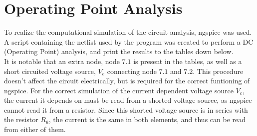 \section{Operating Point Analysis}
\label{sec:simulation}

To realize the computational simulation of the circuit analysis, ngspice was used. A script containing the netlist used by the program was created to perform a DC (Operating Point) analysis, and print the results to the tables down below.\\ 
It is notable that an extra node, node $7.1$ is present in the tables, as well as a short circuited voltage source, $V_{e}$ connecting node $7.1$ and $7.2$. This procedure doesn't affect the circuit electrically, but is required for the correct funtioning of ngspice. For the correct simulation of the current dependent voltage source $V_{c}$, the current it depends on must be read from a shorted voltage source, as ngspice cannot read it from a resistor. Since this shorted voltage source is in series with the resistor $R_{6}$, the current is the same in both elements, and thus can be read from either of them.\\ 


%    


